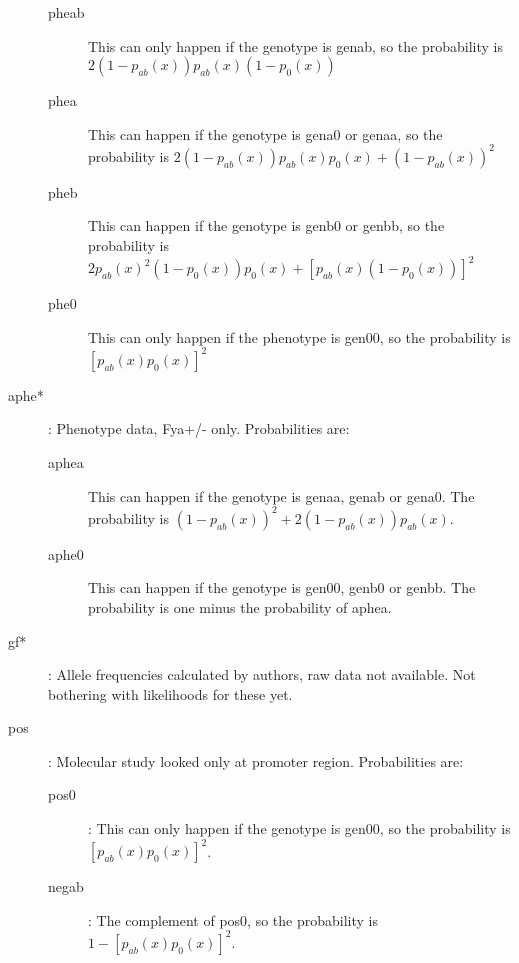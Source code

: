 \documentclass[a4paper]{article}
\begin{document}
\begin{description}
    \begin{description}
        \item[pheab] This can only happen if the genotype is genab, so the probability is $2(1-p_{ab}(x))p_{ab}(x)(1-p_0(x))$
        \item[phea] This can happen if the genotype is gena0 or genaa, so the probability is $2(1-p_{ab}(x))p_{ab}(x)p_0(x)+(1-p_{ab}(x))^2$
        \item[pheb] This can happen if the genotype is genb0 or genbb, so the probability is $2p_{ab}(x)^2(1-p_0(x))p_0(x)+[p_{ab}(x)(1-p_0(x))]^2$
        \item[phe0] This can only happen if the phenotype is gen00, so the probability is $[p_{ab}(x)p_0(x)]^2$
    \end{description}
    \item[aphe*]: Phenotype data, Fya+/- only. Probabilities are:
    \begin{description}
        \item[aphea] This can happen if the genotype is genaa, genab or gena0. The probability is $(1-p_{ab}(x))^2+2(1-p_{ab}(x))p_{ab}(x)$.
        \item[aphe0] This can happen if the genotype is gen00, genb0 or genbb. The probability is one minus the probability of aphea.
    \end{description}
    \item[gf*]: Allele frequencies calculated by authors, raw data not available. Not bothering with likelihoods for these yet.
    \item[pos]: Molecular study looked only at promoter region. Probabilities are:
    \begin{description}
        \item[pos0]: This can only happen if the genotype is gen00, so the probability is $[p_{ab}(x)p_0(x)]^2$.
        \item[negab]: The complement of pos0, so the probability is $1-[p_{ab}(x)p_0(x)]^2$.
    \end{description}
\end{description}
\end{document}
